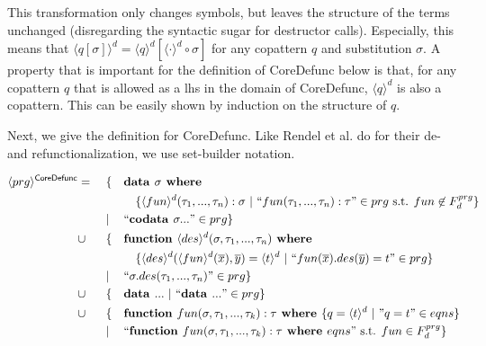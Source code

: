 This transformation only changes symbols, but leaves the structure of the terms unchanged (disregarding the syntactic sugar for destructor calls). Especially, this means that $\langle q[\sigma] \rangle^d = \langle q \rangle^d [\langle \cdot \rangle^d \circ \sigma]$ for any copattern $q$ and substitution $\sigma$. A property that is important for the definition of \textsf{CoreDefunc} below is that, for any copattern $q$ that is allowed as a lhs in the domain of \textsf{CoreDefunc}, $\langle q \rangle^d$ is also a copattern. This can be easily shown by induction on the structure of $q$.

Next, we give the definition for \textsf{CoreDefunc}. Like Rendel et al. do for their de- and refunctionalization, we use set-builder notation.

\begin{algorithm}

\begin{align*}
\langle prg \rangle^{\textsf{CoreDefunc}} & = ~&& \{ && \textrm{\textbf{data }} \sigma \textrm{\textbf{ where }} \span\span\span\span \\
& && && && \{ \langle fun \rangle^d (\tau_1, ..., \tau_n): \sigma ~ | ~ `` fun(\tau_1, ..., \tau_n): \tau " \in prg \text{ s.t. } fun \not\in F^{prg}_d \} \\
& && | && `` \textrm{\textbf{codata }} \sigma ... " \in prg \} \span\span\span\span \\
& \cup && \{ && \textrm{\textbf{function }} \langle des \rangle^d (\sigma, \tau_1, ..., \tau_n) \textrm{\textbf{ where}} \span\span\span\span \\
& && && && \{ \langle des \rangle^d (\langle fun \rangle^d (\overline{x}), \overline{y}) = \langle t \rangle^d ~ | ~ `` fun(\overline{x}).des(\overline{y}) = t " \in prg \} \\
& && | && `` \sigma.des(\tau_1, ..., \tau_n) " \in prg \} \span\span\span\span \\
& \cup && \{ && \textrm{\textbf{data }} ... ~ | ~ `` \textrm{\textbf{data }} ... " \in prg \} \span\span\span\span \\
& \cup && \{ && \textrm{\textbf{function }} fun(\sigma, \tau_1, ..., \tau_k): \tau \textrm{\textbf{ where }} \{ q = \langle t \rangle^d ~ | ~ "q = t" \in eqns \} \span\span\span\span \\
& && | && `` \textrm{\textbf{function }} fun(\sigma, \tau_1, ..., \tau_k): \tau \textrm{\textbf{ where }} eqns " \text{ s.t. } fun \in F^{prg}_d \} \span\span\span\span
\end{align*}

\end{algorithm}

